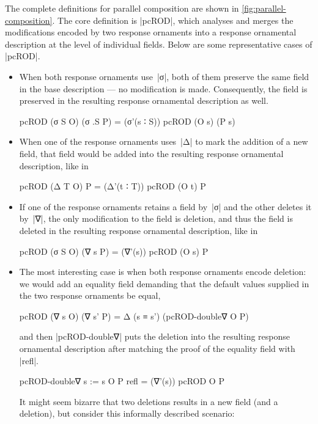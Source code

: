 The complete definitions for parallel composition are shown in \autoref{fig:parallel-composition}.
The core definition is |pcROD|, which analyses and merges the modifications encoded by two response ornaments into a response ornamental description at the level of individual fields.
Below are some representative cases of |pcROD|.
\begin{itemize}
\item When both response ornaments use~|σ|, both of them preserve the same field in the base description --- no modification is made.
Consequently, the field is preserved in the resulting response ornamental description as well.
\begin{code}
pcROD (σ S O) (σ .S P) = (σ'(s ∶ S)) pcROD (O s) (P s)
\end{code}
\item When one of the response ornaments uses~|Δ| to mark the addition of a new field, that field would be added into the resulting response ornamental description, like in
\begin{code}
pcROD (Δ T O) P = (Δ'(t ∶ T)) pcROD (O t) P
\end{code}
\item If one of the response ornaments retains a field by~|σ| and the other deletes it by~|∇|, the only modification to the field is deletion, and thus the field is deleted in the resulting response ornamental description, like in
\begin{code}
pcROD (σ S O) (∇ s P) = (∇'(s)) pcROD (O s) P
\end{code}
\item The most interesting case is when both response ornaments encode deletion: we would add an equality field demanding that the default values supplied in the two response ornaments be equal,
\begin{code}
pcROD (∇ s O) (∇ s' P) = Δ (s ≡ s') (pcROD-double∇ O P)
\end{code}
and then |pcROD-double∇| puts the deletion into the resulting response ornamental description after matching the proof of the equality field with |refl|.
\begin{code}
pcROD-double∇ {s := s} O P refl = (∇'(s)) pcROD O P
\end{code}
It might seem bizarre that two deletions results in a new field (and a deletion), but consider this informally described scenario:

\end{itemize}
